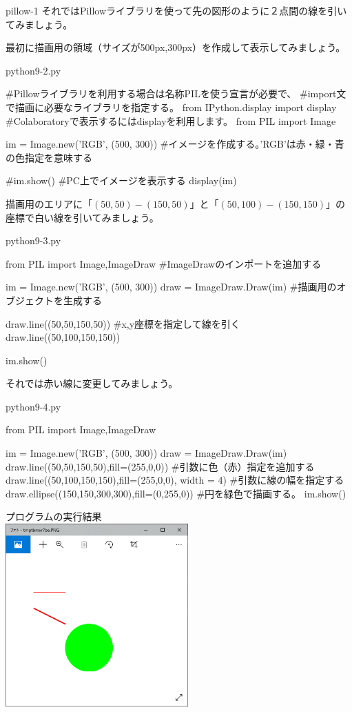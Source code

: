 \documentclass[11pt,a4paper,dvipdfmx,titlepage]{jsreport}
\begin{document}
\begin{pabox}{pillow-1}
それではPillowライブラリを使って先の図形のように２点間の線を引いてみましょう。

最初に描画用の領域（サイズが500px,300px）を作成して表示してみましょう。


\begin{codebox}{python9-2.py}
\begin{listing}{1}
#Pillowライブラリを利用する場合は名称PILを使う宣言が必要で、
#import文で描画に必要なライブラリを指定する。
from IPython.display import display #Colaboratoryで表示するにはdisplayを利用します。
from PIL import Image

im = Image.new('RGB', (500, 300)) #イメージを作成する。'RGB'は赤・緑・青の色指定を意味する

#im.show() #PC上でイメージを表示する
display(im)
\end{listing}
\end{codebox}

描画用のエリアに「$(50,50)-(150,50)$」と「$(50,100)-(150,150)$」の座標で白い線を引いてみましょう。



\begin{codebox}{python9-3.py}
\begin{listing}{1}
from PIL import Image,ImageDraw #ImageDrawのインポートを追加する

im = Image.new('RGB', (500, 300))
draw = ImageDraw.Draw(im) #描画用のオブジェクトを生成する

draw.line((50,50,150,50)) #x,y座標を指定して線を引く 
draw.line((50,100,150,150))

im.show()
\end{listing}
\end{codebox}

それでは赤い線に変更してみましょう。


\begin{codebox}{python9-4.py}
\begin{listing}{1}
from PIL import Image,ImageDraw

im = Image.new('RGB', (500, 300))
draw = ImageDraw.Draw(im)
draw.line((50,50,150,50),fill=(255,0,0)) #引数に色（赤）指定を追加する
draw.line((50,100,150,150),fill=(255,0,0), width = 4)
  #引数に線の幅を指定する
draw.ellipse((150,150,300,300),fill=(0,255,0))
  #円を緑色で描画する。
im.show()
\end{listing}
プログラムの実行結果\\
\includegraphics[width=7cm]{images/drawimage2.png}
\end{codebox}



\end{pabox}
\end{document}
